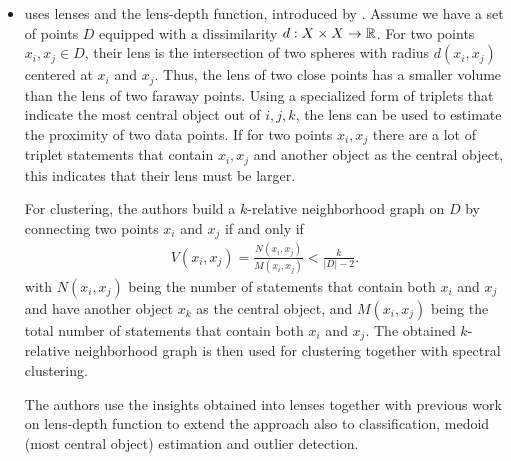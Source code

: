 \begin{itemize}
    \item \cite{kleindessnerLensDepthFunction2017} uses lenses and the lens-depth function, 
        introduced by \cite{liuLensDataDepth2011}. Assume we have a set of points $D$ equipped
        with a dissimilarity $d: X \times X \to \mathbb{R}$. 
        For two points $x_i, x_j \in D$, their lens is the intersection of two
        spheres with radius $d(x_i, x_j)$ centered at $x_i$ and $x_j$. 
        Thus, the lens of two close points has a smaller volume than the lens of
        two faraway points. Using a specialized form of triplets that
        indicate the most central object out of $i,j,k$, the lens can be used to 
        estimate the proximity of two data points. If for two points $x_i, x_j$ there are 
        a lot of triplet statements that contain $x_i, x_j$ and another object as the central 
        object, this indicates that their lens must be larger. 

        For clustering, the authors 
        build a $k$-relative neighborhood graph on $D$ by connecting two points $x_i$ and $x_j$
        if and only if
        \begin{align*}
            V(x_i, x_j) = \frac{N(x_i, x_j)}{M(x_i, x_j)}  < \frac{k}{\left| D \right| - 2}
        .\end{align*}
        with $N(x_i, x_j)$ being the number of statements that contain both $x_i$ and $x_j$ and
        have another object $x_k$ as the central object, and $M(x_i, x_j)$ being
        the total number of statements that contain both $x_i$ and $x_j$.  
        The obtained $k$-relative neighborhood graph is then used for clustering 
        together with spectral clustering.

        The authors use the insights obtained into lenses together with previous work on 
        lens-depth function to extend the approach also to classification, 
        medoid (most central object) estimation and outlier detection.
         



\end{itemize}
